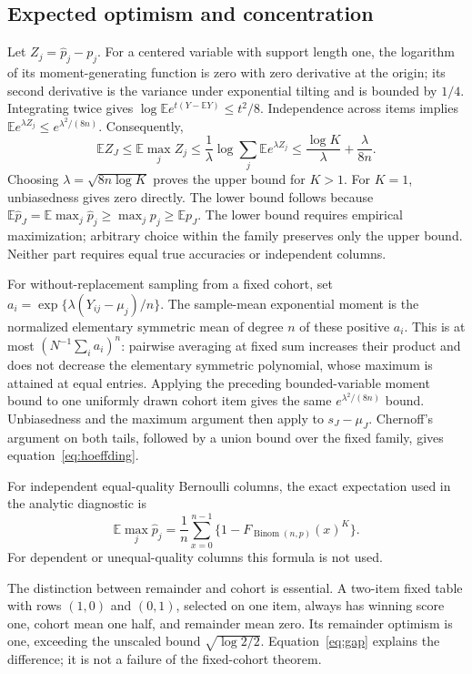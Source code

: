 \documentclass{article}
\newcommand{\E}{\mathbb E}
\begin{document}
\subsection{Expected optimism and concentration}
Let $Z_j=\widehat p_j-p_j$. For a centered variable with support length one, the logarithm of its moment-generating function is zero with zero derivative at the origin; its second derivative is the variance under exponential tilting and is bounded by $1/4$. Integrating twice gives $\log\E e^{t(Y-\E Y)}\leq t^2/8$. Independence across items implies $\E e^{\lambda Z_j}\leq e^{\lambda^2/(8n)}$. Consequently,
\[
\E Z_J\leq\E\max_j Z_j\leq\frac1\lambda\log\sum_j\E e^{\lambda Z_j}
\leq\frac{\log K}{\lambda}+\frac{\lambda}{8n}.
\]
Choosing $\lambda=\sqrt{8n\log K}$ proves the upper bound for $K>1$. For $K=1$, unbiasedness gives zero directly. The lower bound follows because $\E\widehat p_J=\E\max_j\widehat p_j\geq\max_jp_j\geq\E p_J$. The lower bound requires empirical maximization; arbitrary choice within the family preserves only the upper bound. Neither part requires equal true accuracies or independent columns.

For without-replacement sampling from a fixed cohort, set $a_i=\exp\{\lambda(Y_{ij}-\mu_j)/n\}$. The sample-mean exponential moment is the normalized elementary symmetric mean of degree $n$ of these positive $a_i$. This is at most $(N^{-1}\sum_i a_i)^n$: pairwise averaging at fixed sum increases their product and does not decrease the elementary symmetric polynomial, whose maximum is attained at equal entries. Applying the preceding bounded-variable moment bound to one uniformly drawn cohort item gives the same $e^{\lambda^2/(8n)}$ bound. Unbiasedness and the maximum argument then apply to $s_J-\mu_J$. Chernoff's argument on both tails, followed by a union bound over the fixed family, gives equation~\eqref{eq:hoeffding}.

For independent equal-quality Bernoulli columns, the exact expectation used in the analytic diagnostic is
\[
\E\max_j\widehat p_j=\frac1n\sum_{x=0}^{n-1}\{1-F_{\operatorname{Binom}(n,p)}(x)^K\}.
\]
For dependent or unequal-quality columns this formula is not used.

The distinction between remainder and cohort is essential. A two-item fixed table with rows $(1,0)$ and $(0,1)$, selected on one item, always has winning score one, cohort mean one half, and remainder mean zero. Its remainder optimism is one, exceeding the unscaled bound $\sqrt{\log2/2}$. Equation~\eqref{eq:gap} explains the difference; it is not a failure of the fixed-cohort theorem.
\end{document}
